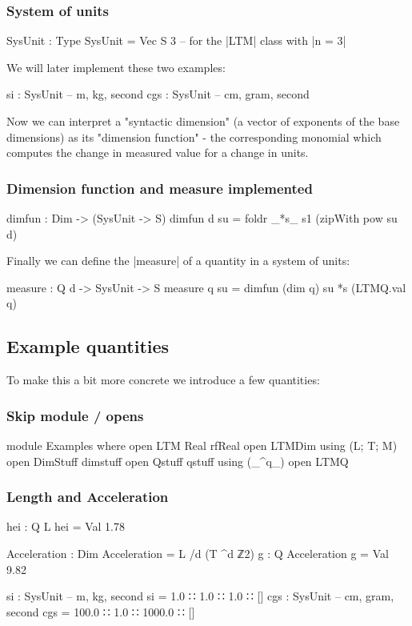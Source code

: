 \documentclass{article}
\begin{document}
\subsubsection{System of units}
\label{sec:orge6bd6ee}
\begin{code}
  SysUnit : Type
  SysUnit = Vec S 3   -- for the |LTM| class with |n = 3|
\end{code}
We will later implement these two examples:
\begin{spec}
  si   : SysUnit  -- m, kg, second
  cgs  : SysUnit  -- cm, gram, second
\end{spec}

Now we can interpret a "syntactic dimension" (a vector of exponents of
the base dimensions) as its "dimension function" - the corresponding
monomial which computes the change in measured value for a change in
units.

\subsubsection{Dimension function and measure implemented}
\label{sec:orgd24d664}
\begin{code}
  dimfun : Dim -> (SysUnit -> S)
  dimfun d su = foldr _*s_ s1 (zipWith pow su d)
\end{code}

Finally we can define the |measure| of a quantity in a system of
units:

\begin{code}
  measure : Q d -> SysUnit -> S
  measure q su = dimfun (dim q) su *s (LTMQ.val q)
\end{code}

\subsection{Example quantities}
\label{sec:org16b660b}
To make this a bit more concrete we introduce a few quantities:
\subsubsection{Skip module / opens}
\label{sec:orgbffed95}
\begin{code}
module Examples where
  open LTM Real rfReal
  open LTMDim using (L; T; M)
  open DimStuff dimstuff
  open Qstuff qstuff using (_^q_)
  open LTMQ
\end{code}
\subsubsection{Length and Acceleration}
\label{sec:orgbce8d66}
\begin{code}
  hei : Q L
  hei = Val 1.78

  Acceleration : Dim
  Acceleration = L /d (T ^d ℤ2)
  g : Q Acceleration
  g = Val 9.82

  si : SysUnit   -- m, kg, second
  si  =   1.0 ∷ 1.0 ∷    1.0 ∷ []
  cgs : SysUnit  -- cm, gram, second
  cgs = 100.0 ∷ 1.0 ∷ 1000.0 ∷ []
\end{code}
\end{document}
